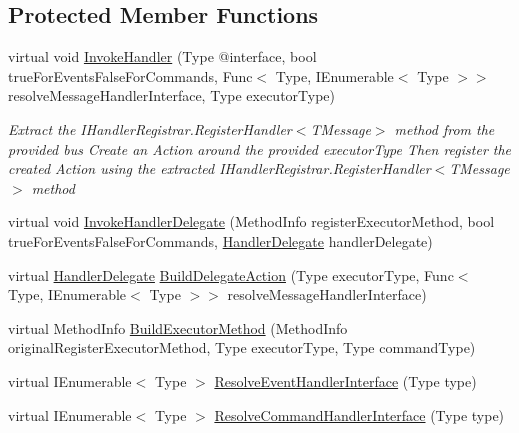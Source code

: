 \subsection*{Protected Member Functions}
\begin{DoxyCompactItemize}
\item 
virtual void \hyperlink{classCqrs_1_1Configuration_1_1BusRegistrar_a159eba5ece9015165be70676a52d8127_a159eba5ece9015165be70676a52d8127}{Invoke\+Handler} (Type @interface, bool true\+For\+Events\+False\+For\+Commands, Func$<$ Type, I\+Enumerable$<$ Type $>$$>$ resolve\+Message\+Handler\+Interface, Type executor\+Type)
\begin{DoxyCompactList}\small\item\em Extract the I\+Handler\+Registrar.\+Register\+Handler$<$\+T\+Message$>$ method from the provided {\itshape bus}  Create an Action around the provided {\itshape executor\+Type}  Then register the created Action using the extracted I\+Handler\+Registrar.\+Register\+Handler$<$\+T\+Message$>$ method \end{DoxyCompactList}\item 
virtual void \hyperlink{classCqrs_1_1Configuration_1_1BusRegistrar_a3103da4cf077104607fe03a862958827_a3103da4cf077104607fe03a862958827}{Invoke\+Handler\+Delegate} (Method\+Info register\+Executor\+Method, bool true\+For\+Events\+False\+For\+Commands, \hyperlink{classCqrs_1_1Configuration_1_1HandlerDelegate}{Handler\+Delegate} handler\+Delegate)
\item 
virtual \hyperlink{classCqrs_1_1Configuration_1_1HandlerDelegate}{Handler\+Delegate} \hyperlink{classCqrs_1_1Configuration_1_1BusRegistrar_a07d27088739f2ae0ac7c551fc6a72ac9_a07d27088739f2ae0ac7c551fc6a72ac9}{Build\+Delegate\+Action} (Type executor\+Type, Func$<$ Type, I\+Enumerable$<$ Type $>$$>$ resolve\+Message\+Handler\+Interface)
\item 
virtual Method\+Info \hyperlink{classCqrs_1_1Configuration_1_1BusRegistrar_a03ecf12389b8f55b75c887e113520ac7_a03ecf12389b8f55b75c887e113520ac7}{Build\+Executor\+Method} (Method\+Info original\+Register\+Executor\+Method, Type executor\+Type, Type command\+Type)
\item 
virtual I\+Enumerable$<$ Type $>$ \hyperlink{classCqrs_1_1Configuration_1_1BusRegistrar_a0af1844a5f7f1c4adfde2499b054aaae_a0af1844a5f7f1c4adfde2499b054aaae}{Resolve\+Event\+Handler\+Interface} (Type type)
\item 
virtual I\+Enumerable$<$ Type $>$ \hyperlink{classCqrs_1_1Configuration_1_1BusRegistrar_a0e118c57c7e804df1d810750befb25df_a0e118c57c7e804df1d810750befb25df}{Resolve\+Command\+Handler\+Interface} (Type type)
\end{DoxyCompactItemize}
